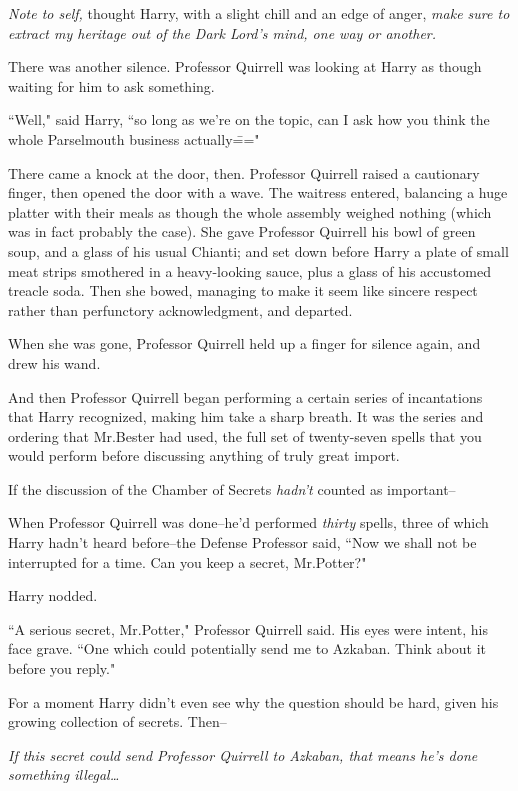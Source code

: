 \emph{Note to self,} thought Harry, with a slight chill and an edge of anger, \emph{make sure to extract my heritage out of the Dark Lord's mind, one way or another.}

There was another silence. Professor Quirrell was looking at Harry as though waiting for him to ask something.

``Well," said Harry, ``so long as we're on the topic, can I ask how you think the whole Parselmouth business actually\==="

There came a knock at the door, then. Professor Quirrell raised a cautionary finger, then opened the door with a wave. The waitress entered, balancing a huge platter with their meals as though the whole assembly weighed nothing (which was in fact probably the case). She gave Professor Quirrell his bowl of green soup, and a glass of his usual Chianti; and set down before Harry a plate of small meat strips smothered in a heavy-looking sauce, plus a glass of his accustomed treacle soda. Then she bowed, managing to make it seem like sincere respect rather than perfunctory acknowledgment, and departed.

When she was gone, Professor Quirrell held up a finger for silence again, and drew his wand.

And then Professor Quirrell began performing a certain series of incantations that Harry recognized, making him take a sharp breath. It was the series and ordering that Mr.\?Bester had used, the full set of twenty-seven spells that you would perform before discussing anything of truly great import.

If the discussion of the Chamber of Secrets \emph{hadn't} counted as important\---

When Professor Quirrell was done\---he'd performed \emph{thirty} spells, three of which Harry hadn't heard before\---the Defense Professor said, ``Now we shall not be interrupted for a time. Can you keep a secret, Mr.\?Potter?"

Harry nodded.

``A serious secret, Mr.\?Potter," Professor Quirrell said. His eyes were intent, his face grave. ``One which could potentially send me to Azkaban. Think about it before you reply."

For a moment Harry didn't even see why the question should be hard, given his growing collection of secrets. Then\---

\emph{If this secret could send Professor Quirrell to Azkaban, that means he's done something illegal{\ldots}}

